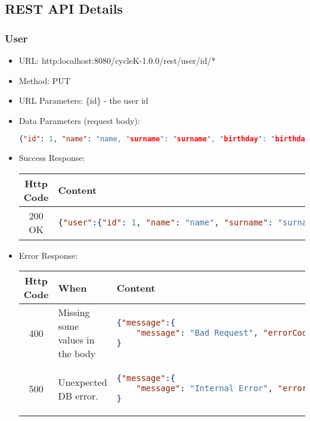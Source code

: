 \subsection{REST API Details}

\subsubsection*{User}
\begin{itemize}
\item URL: http:localhost:8080/cycleK-1.0.0/rest/user/id/*
\item Method: PUT
\item URL Parameters: \{id\} - the user id
\item Data Parameters (request body): 
\begin{lstlisting}[language=json,firstnumber=1]
    {"id": 1, "name": "name, "surname": "surname", "birthday": "birthday", "gender": "gender", "username": "username", "password": "password"}
\end{lstlisting}
\item Success Response: 
\begin{longtable}{|c|p{13.5cm}|}
\hline
\textbf{Http Code} & \textbf{Content} \\\hline
200 OK  &
\begin{lstlisting}[language=json,firstnumber=1]
{"user":{"id": 1, "name": "name", "surname": "surname", "birthday": "birthday", "gender": "gender", "username": "username", "password": "password"}}
\end{lstlisting}\\\hline
\end{longtable}
\item Error Response:
\begin{longtable}{|c|p{4cm}|p{9cm}|}
\hline
\textbf{Http Code} & \textbf{When} & \textbf{Content} \\\hline
400 &  Missing some values in the body &
\begin{lstlisting}[language=json,firstnumber=1]
{"message":{
    "message": "Bad Request", "errorCode": "-107", "errorDetails": "Cannot update the user, body must contains all parameters.", "error": true}
}
\end{lstlisting}\\\hline
500 & Unexpected DB error. & 
\begin{lstlisting}[language=json,firstnumber=1]
{"message":{
    "message": "Internal Error", "errorCode": "-108", "errorDetails": "Internal Server Error", "Unexpected Error while updating user.", "error": true}
}
\end{lstlisting}\\\hline
\end{longtable}
\end{itemize}
\newpage

